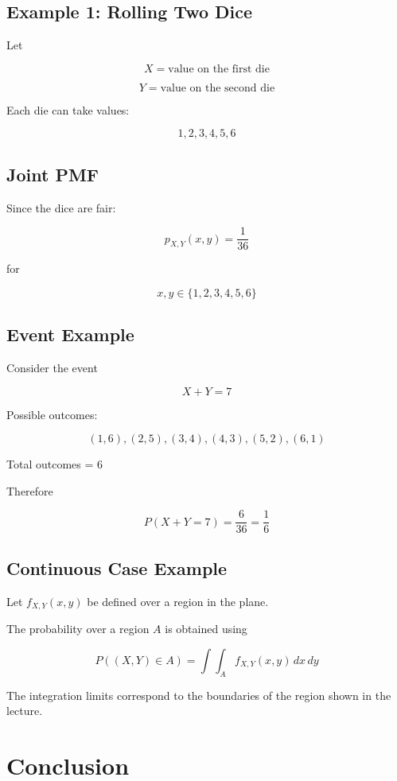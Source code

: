 \documentclass[12pt]{article}
\begin{document}
\subsection{Example 1: Rolling Two Dice}

Let

\[
X = \text{value on the first die}
\]

\[
Y = \text{value on the second die}
\]

Each die can take values:

\[
1,2,3,4,5,6
\]

\subsection{Joint PMF}

Since the dice are fair:

\[
p_{X,Y}(x,y) = \frac{1}{36}
\]

for

\[
x,y \in \{1,2,3,4,5,6\}
\]

\subsection{Event Example}

Consider the event

\[
X + Y = 7
\]

Possible outcomes:

\[
(1,6),(2,5),(3,4),(4,3),(5,2),(6,1)
\]

Total outcomes = $6$

Therefore

\[
P(X+Y=7) = \frac{6}{36} = \frac{1}{6}
\]

\subsection{Continuous Case Example}

Let $f_{X,Y}(x,y)$ be defined over a region in the plane.

The probability over a region $A$ is obtained using

\[
P((X,Y) \in A) =
\int\int_A f_{X,Y}(x,y)\, dx\, dy
\]

The integration limits correspond to the boundaries of the region shown in the lecture.

\section{Conclusion}
\end{document}
